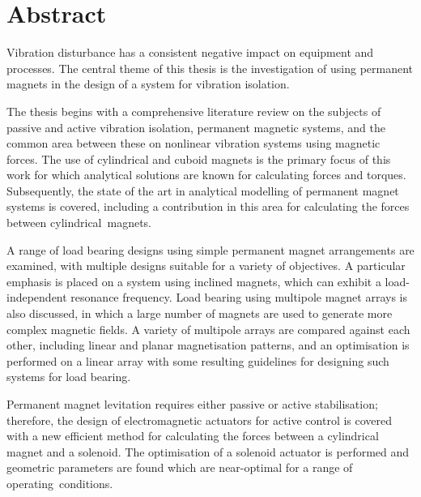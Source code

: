 \documentclass[10pt,a4paper]{memoir}
\def\standaloneabstract{}
\begin{document}
\ifx\standaloneabstract\undefined

  \section*{Abstract}

\else



  \bigskip
  
  \expandafter\noindent
\fi
\small
Vibration disturbance has a consistent negative impact on equipment and processes.
The central theme of this thesis is the investigation of using permanent magnets in the design of a system for vibration isolation.

The thesis begins with a comprehensive literature review on the subjects of passive and active vibration isolation, permanent magnetic systems, and the common area between these on nonlinear vibration systems using magnetic forces.
The use of cylindrical and cuboid magnets is the primary focus of this work for which analytical solutions are known for calculating forces and torques.
Subsequently, the state of the art in analytical modelling of permanent magnet systems is covered, including a contribution in this area for calculating the forces between cylindrical~magnets.

A range of load bearing designs using simple permanent magnet arrangements are examined, with multiple designs suitable for a variety of objectives.
A particular emphasis is placed on a system using inclined magnets, which can exhibit a load-independent resonance frequency.
Load bearing using multipole magnet arrays is also discussed, in which a large number of magnets are used to generate more complex magnetic fields.
A variety of multipole arrays are compared against each other, including linear and planar magnetisation patterns, and an optimisation is performed on a linear array with some resulting guidelines for designing such systems for load bearing.

Permanent magnet levitation requires either passive or active stabilisation; therefore, the design of electromagnetic actuators for active control is covered with a new efficient method for calculating the forces between a cylindrical magnet and a solenoid.
The optimisation of a solenoid actuator is performed and geometric parameters are found which are near-optimal for a range of operating~conditions.
\end{document}
